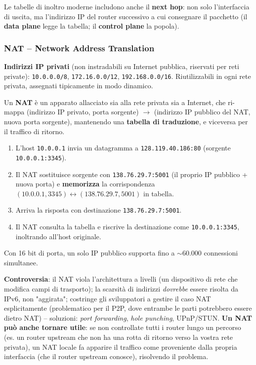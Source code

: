 \documentclass[12pt, a4paper]{article}
\begin{document}
Le tabelle di inoltro moderne includono anche il \textbf{next hop}: non solo l'interfaccia di uscita, ma l'indirizzo IP del router successivo a cui consegnare il pacchetto (il \textbf{data plane} legge la tabella; il \textbf{control plane} la popola).

\subsubsection{NAT -- Network Address Translation}

\textbf{Indirizzi IP privati} (non instradabili su Internet pubblica, riservati per reti private): \texttt{10.0.0.0/8}, \texttt{172.16.0.0/12}, \texttt{192.168.0.0/16}. Riutilizzabili in ogni rete privata, assegnati tipicamente in modo dinamico.

Un \textbf{NAT} è un apparato allacciato sia alla rete privata sia a Internet, che ri-mappa (indirizzo IP privato, porta sorgente) $\to$ (indirizzo IP pubblico del NAT, nuova porta sorgente), mantenendo una \textbf{tabella di traduzione}, e viceversa per il traffico di ritorno.

\begin{tcolorbox}[colback=lightergray!10, colframe=tocsec, title=\textbf{Esempio completo di NAT}]
\begin{enumerate}
    \item L'host \texttt{10.0.0.1} invia un datagramma a \texttt{128.119.40.186:80} (sorgente \texttt{10.0.0.1:3345}).
    \item Il NAT sostituisce sorgente con \texttt{138.76.29.7:5001} (il proprio IP pubblico + nuova porta) e \textbf{memorizza} la corrispondenza $(10.0.0.1,3345) \leftrightarrow (138.76.29.7,5001)$ in tabella.
    \item Arriva la risposta con destinazione \texttt{138.76.29.7:5001}.
    \item Il NAT consulta la tabella e riscrive la destinazione come \texttt{10.0.0.1:3345}, inoltrando all'host originale.
\end{enumerate}
Con 16 bit di porta, un solo IP pubblico supporta fino a $\sim$60.000 connessioni simultanee.
\end{tcolorbox}

\textbf{Controversia}: il NAT viola l'architettura a livelli (un dispositivo di rete che modifica campi di trasporto); la scarsità di indirizzi \textit{dovrebbe} essere risolta da IPv6, non "aggirata"; costringe gli sviluppatori a gestire il caso NAT esplicitamente (problematico per il P2P, dove entrambe le parti potrebbero essere dietro NAT) -- soluzioni: \textit{port forwarding}, \textit{hole punching}, UPnP/STUN. \textbf{Un NAT può anche tornare utile}: se non controllate tutti i router lungo un percorso (es. un router upstream che non ha una rotta di ritorno verso la vostra rete privata), un NAT locale fa apparire il traffico come proveniente dalla propria interfaccia (che il router upstream conosce), risolvendo il problema.
\end{document}
